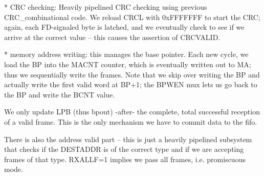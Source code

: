    * CRC checking: Heavily pipelined CRC checking using previous
     CRC_combinational code. We reload CRCL with 0xFFFFFFF to start
     the CRC; again, each FD-signaled byte is latched, and we
     eventually check to see if we arrive at the correct value -- this
     causes the assertion of CRCVALID.

    * memory address writing: this manages the base pointer. Each new
      cycle, we load the BP into the MACNT counter, which is
      eventually written out to MA; thus we sequentially write the
      frames. Note that we skip over writing the BP and actually write
      the first valid word at BP+1; the BPWEN mux lets us go back to
      the BP and write the BCNT value.

    We only update LPB (thus bpout) -after- the complete, total successful reception of a valid frame. This is the only mechanism we have to commit data to the fifo. 

There is also the address valid part -- this is just a heavily
pipelined subsystem that checks if the DESTADDR is of the correct type
and if we are accepting frames of that type. RXALLF=1 implies we pass
all frames, i.e. promiscuous mode.

